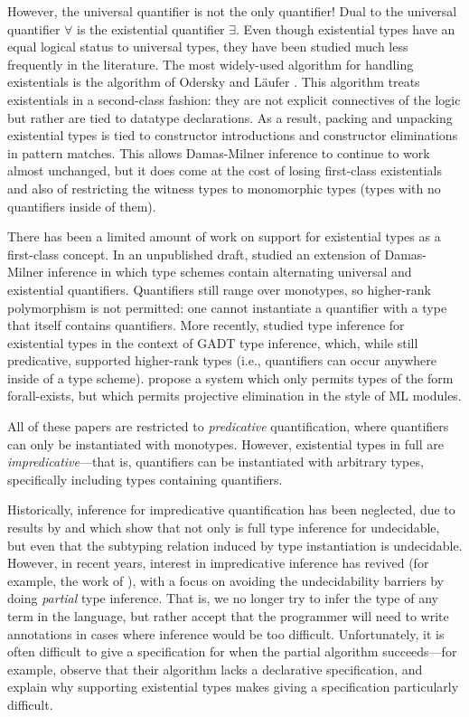 However, the universal quantifier is not the only quantifier! Dual to the
universal quantifier $\forall$ is the existential quantifier $\exists$. Even
though existential types have an equal logical status to universal types, they
have been studied much less frequently in the literature. The most widely-used
algorithm for handling existentials is the algorithm of Odersky and L{\"a}ufer
\cite{laufer94:polymorphic}. This algorithm treats existentials in a
second-class fashion: they are not explicit connectives of the logic but rather
are tied to datatype declarations. As a result, packing and unpacking
existential types is tied to constructor introductions and constructor
eliminations in pattern matches. This allows Damas-Milner inference to continue
to work almost unchanged, but it does come at the cost of losing first-class
existentials and also of restricting the witness types to monomorphic types
(\ie types with no quantifiers inside of them).

There has been a limited amount of work on support for existential types as a
first-class concept. In an unpublished draft, \citet{leijen06:first-class}
studied an extension of Damas-Milner inference in which type schemes contain
alternating universal and existential quantifiers. Quantifiers still range over
monotypes, so higher-rank 
polymorphism is not permitted: one cannot instantiate a quantifier with a type
that itself contains quantifiers.
More recently,
\citet{dunfield16:existential} studied type inference for existential types in
the context of GADT type inference, which, while still predicative, supported
higher-rank types (i.e., quantifiers can occur anywhere inside of a type
scheme). \citet{eisenberg21:existential} propose a system which only permits
types of the form forall-exists, but which permits projective elimination in the
style of ML modules. 

All of these papers are restricted to \emph{predicative} quantification, where
quantifiers can only be instantiated with monotypes. However, existential types
in full \systemf are \emph{impredicative}---that is, quantifiers can be
instantiated with arbitrary types, specifically including types containing
quantifiers.

Historically, inference for impredicative quantification has been neglected, due
to results by \citet{tiuryn-urzczyn-96} and \citet{chrzaszcz-98} which show that
not only is full type inference for \systemf undecidable, but even that the
subtyping relation induced by type instantiation is undecidable. However, in
recent years, interest in impredicative inference has revived (for example, the
work of \citet{serrano-2020}), with a focus on avoiding the undecidability
barriers by doing \emph{partial} type inference. That is, we no longer try to
infer the type of any term in the language, but rather accept that the
programmer will need to write annotations in cases where inference would be too
difficult. Unfortunately, it is often difficult to give a specification for when
the partial algorithm succeeds---for example, \citet{eisenberg21:existential}
observe that their algorithm lacks a declarative specification, and explain why
supporting existential types makes giving a specification particularly
difficult. 

